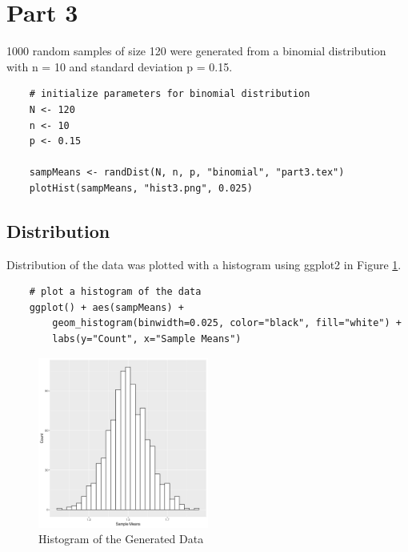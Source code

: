 \documentclass[paper=a4, fontsize=11pt]{article}
\begin{document}
    \section{Part 3}
        1000 random samples of size 120 were generated from a binomial distribution with n = 10 and standard deviation p = 0.15.

\begin{lstlisting}
    # initialize parameters for binomial distribution
    N <- 120
    n <- 10
    p <- 0.15

    sampMeans <- randDist(N, n, p, "binomial", "part3.tex")
    plotHist(sampMeans, "hist3.png", 0.025)
\end{lstlisting}

        

        \subsection{Distribution}
            Distribution of the data was plotted with a histogram using ggplot2 in Figure \ref{fig:hist3}.
\begin{lstlisting}
    # plot a histogram of the data
    ggplot() + aes(sampMeans) + 
        geom_histogram(binwidth=0.025, color="black", fill="white") +
        labs(y="Count", x="Sample Means")
\end{lstlisting}

            \begin{figure}[h!]
                \begin{center}
                    \includegraphics[width=0.5\textwidth]{figures/hist3.png}
                    \caption{Histogram of the Generated Data} \label{fig:hist3}
                \end{center}
            \end{figure}
\end{document}
